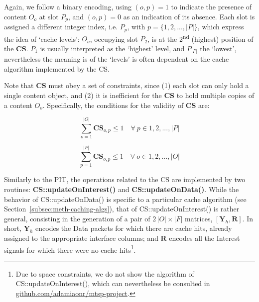 Again, we follow a binary encoding, using $(o, p) = 1$ to indicate the 
presence of content $O_o$ at slot $P_p$, and $(o, p) = 0$ as an indication of 
its absence. Each slot is assigned a different integer 
index, i.e. $P_p$, with $p = \{1, 2, ..., |P|\}$, which express the idea of `cache levels': 
$O_o$, occupying slot $P_2$, is at the 2\textsuperscript{nd} 
(highest) position of the \textbf{CS}. $P_1$ is usually interpreted as the `highest' 
level, and $P_{|P|}$ the `lowest', nevertheless the meaning is of the `levels' 
is often dependent on the cache algorithm implemented by the CS.\shortvertbreak

Note that \textbf{CS} must obey a set of constraints, since (1) 
each slot can only hold a single content object, and (2) it is inefficient for 
the \textbf{CS} to hold multiple copies of a content $O_o$. Specifically, the 
conditions for the validity of \textbf{CS} are:

\begin{equation}
    \sum_{o=1}^{|O|} \textbf{CS}_{o,p} \le 1 \quad \forall \ p \in {1, 2, ..., |P|}
    \label{eq:cs-constraints-1}
\end{equation}

\begin{equation}
    \sum_{p=1}^{|P|} \textbf{CS}_{o,p} \le 1 \quad \forall \ o \in {1, 2, ..., |O|}
    \label{eq:cs-constraints-2}
\end{equation}

Similarly to the PIT, the operations related to the CS are implemented by two 
routines: \textbf{CS::updateOnInterest()} and \textbf{CS::updateOnData()}. While 
the behavior of CS::updateOnData() is specific to a particular cache 
algorithm (see Section~\ref{subsec:meth-caching-algs}), that of CS::updateOnInterest() 
is rather general, consisting in the generation of a pair of $2\,|O| \times |F|$ 
matrices, $[\textbf{Y}_h, \textbf{R}]$. In short, $\textbf{Y}_h$ encodes 
the Data packets for which there are cache hits, already assigned to the 
appropriate interface columns; and $\textbf{R}$ encodes all the Interest signals 
for which there were no cache hits\footnote{Due to space constraints, we do not 
show the algorithm of CS::updateOnInterest(), which can nevertheless be 
consulted in \url{github.com/adamiaonr/mtsp-project}.}.\shortvertbreak


